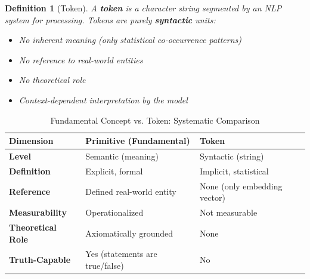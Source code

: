 \documentclass[11pt,a4paper]{article}
\newtheorem{definition}{Definition}[section]
\begin{document}
\begin{definition}[Token]
\label{def:token}
A \textbf{token} is a character string segmented by an NLP system for processing. Tokens are purely \textbf{syntactic} units:
\begin{itemize}
    \item No inherent meaning (only statistical co-occurrence patterns)
    \item No reference to real-world entities
    \item No theoretical role
    \item Context-dependent interpretation by the model
\end{itemize}
\end{definition}

\begin{table}[h]
\centering
\caption{Fundamental Concept vs. Token: Systematic Comparison}
\label{tab:primitiv-token}
\begin{tabular}{p{3cm}p{5.2cm}p{5.2cm}}
\toprule
\textbf{Dimension} & \textbf{Primitive (Fundamental)} & \textbf{Token} \\
\midrule
\textbf{Level} & Semantic (meaning) & Syntactic (string) \\
\textbf{Definition} & Explicit, formal & Implicit, statistical \\
\textbf{Reference} & Defined real-world entity & None (only embedding vector) \\
\textbf{Measurability} & Operationalized & Not measurable \\
\textbf{Theoretical Role} & Axiomatically grounded & None \\
\textbf{Truth-Capable} & Yes (statements are true/false) & No \\
\bottomrule
\end{tabular}
\end{table}
\end{document}
